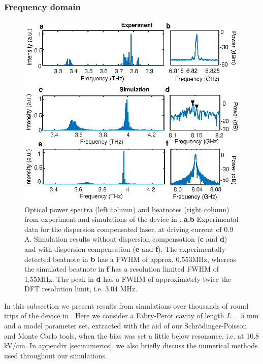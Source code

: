 \documentclass[10pt,letterpaper]{article}
\begin{document}
{\subsubsection{Frequency domain}

\begin{figure}[h!]
	\begin{center}
		\includegraphics[scale=.85]{figs/SPECTRA_EXPERIMENT.eps}
		\caption{ Optical power spectra (left column) and beatnotes (right column) from experiment and simulations of the device in \cite{burghoff2014terahertz}. \textbf{a},\textbf{b} Experimental data for the dispersion compensated laser, at driving current of $0.9$ A. Simulation results without dispersion compensation (\textbf{c} and \textbf{d})  and with dispersion compensation (\textbf{e} and \textbf{f}). The experimentally detected beatnote in \textbf{b} has a FWHM of approx. 0.553MHz, whereas the simulated beatnote in \textbf{f} has a resolution limited FWHM of 1.55MHz. The peak in \textbf{d} has a FWHM of approximately twice the DFT resolution limit, i.e. 3.04 MHz.} \label{fig:img05}
	\end{center}	
\end{figure}

In this subsection we present results from simulations over thousands of round trips of the device in \cite{burghoff2014terahertz}. Here we consider a Fabry-Perot cavity of length $L = 5 $ mm and a model parameter set, extracted with the aid of our Schr{\"o}dinger-Poisson and Monte Carlo tools, when the bias was set a little below resonance, i.e. at 10.8 kV/cm. In appendix \ref{sec:numerics}, we also briefly discuss the numerical methods used throughout our simulations.

}
\end{document}
